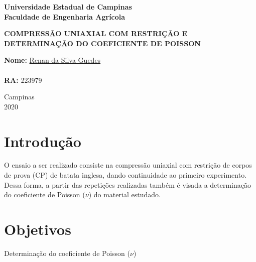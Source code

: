 \documentclass[a4paper, 12pt]{article}
\begin{document}
	\begin{titlepage}
		\begin{center}
			\begin{large}
				\textbf{Universidade Estadual de Campinas}\\\vspace{.5cm}
				\textbf{Faculdade de Engenharia Agrícola}\\\vspace{10.5cm}
			\end{large}
			\begin{large}
				\uppercase{\textbf{Compressão Uniaxial com Restrição e determinação do coeficiente de Poisson}}\\\vspace{4cm}
			\end{large}
		\end{center}
		\begin{large}
			\noindent\textbf{Nome:} \href{https://github.com/RenanSGuedes/576}{Renan da Silva Guedes}\\\\
			\noindent\textbf{RA:} 223979\\\vspace{4cm}
		\end{large}
		\begin{center}
			\begin{large}
				Campinas\\\vspace{.3cm}
				2020
			\end{large}
		\end{center}
	\end{titlepage}
	
	\newpage
	
	\section{Introdução}
	
	O ensaio a ser realizado consiste na compressão uniaxial com restrição de corpos de prova (CP) de batata inglesa, dando continuidade ao primeiro experimento. Dessa forma, a partir das repetições realizadas também é visada a determinação do coeficiente de Poisson ($\nu$) do material estudado.
	
	\section{Objetivos}
	
	Determinação do coeficiente de Poisson ($\nu$)
	
\end{document}
